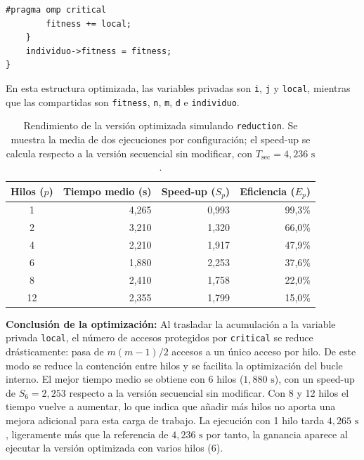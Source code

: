 \documentclass[12pt]{article}
\begin{document}
\begin{enumerate}
\begin{lstlisting}[caption={Simulación de reducción mediante acumulación local y \texttt{critical}.}, style={EstiloC}]
        #pragma omp critical
        fitness += local;
    }
    individuo->fitness = fitness;
}
\end{lstlisting}

En esta estructura optimizada, las variables privadas son \texttt{i}, \texttt{j} y \texttt{local},
 mientras que las compartidas son \texttt{fitness}, \texttt{n}, \texttt{m}, \texttt{d} e \texttt{individuo}.

\begin{table}[htbp]
    \centering
    \small
    \begin{tabular}{crrr}
        \toprule
        \textbf{Hilos ($p$)} & \textbf{Tiempo medio (s)} & \textbf{Speed-up ($S_p$)} & \textbf{Eficiencia ($E_p$)} \\
        \midrule
        1  & 4,265 & 0,993 & 99,3\% \\
        2  & 3,210 & 1,320 & 66,0\% \\
        4  & 2,210 & 1,917 & 47,9\% \\
        6  & 1,880 & 2,253 & 37,6\% \\
        8  & 2,410 & 1,758 & 22,0\% \\
        12 & 2,355 & 1,799 & 15,0\% \\
        \bottomrule
    \end{tabular}
    \caption{Rendimiento de la versión optimizada simulando \texttt{reduction}. Se muestra la media de dos ejecuciones por configuración; el speed-up se calcula respecto a la versión secuencial sin modificar, con $T_{\text{sec}} = 4,236\text{ s}$.}
    \label{tab:optimizada_critical}
\end{table}

\textbf{Conclusión de la optimización:}
Al trasladar la acumulación a la variable privada \texttt{local}, el número de accesos 
protegidos por \texttt{critical} se reduce drásticamente: pasa de $m(m-1)/2$ accesos a 
un único acceso por hilo. De este modo se reduce la contención entre hilos y se facilita
 la optimización del bucle interno. El mejor tiempo medio se 
 obtiene con 6 hilos ($1,880\text{ s}$), con un speed-up de $S_6 = 2,253$ respecto a
  la versión secuencial sin modificar. Con 8 y 12 hilos el tiempo vuelve a aumentar, 
  lo que indica que añadir más hilos no aporta una mejora adicional para esta carga de
   trabajo. La ejecución con 1 hilo tarda $4,265\text{ s}$, ligeramente más que la referencia 
   de $4,236\text{ s}$ por tanto, la ganancia aparece al ejecutar la versión optimizada con varios hilos (6).


\end{enumerate}
\end{document}
